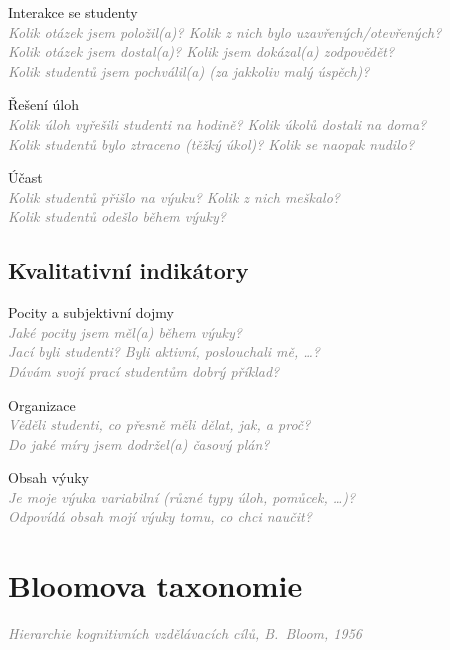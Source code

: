 \documentclass[twoside,openany]{book}
\newcommand{\note}[1]{\textcolor{gray}{\small\itshape #1}}
\begin{document}
Interakce se studenty\\
\note{Kolik otázek jsem položil(a)? Kolik z nich bylo uzavřených/otevřených?\\
Kolik otázek jsem dostal(a)? Kolik jsem dokázal(a) zodpovědět?\\
Kolik studentů jsem pochválil(a) (za jakkoliv malý úspěch)?}

Řešení úloh\\
\note{Kolik úloh vyřešili studenti na hodině? Kolik úkolů dostali na doma?\\
Kolik studentů bylo ztraceno (těžký úkol)? Kolik se naopak nudilo?}

Účast\\
\note{Kolik studentů přišlo na výuku? Kolik z nich meškalo?\\
Kolik studentů odešlo během výuky?}

\section*{Kvalitativní indikátory}

Pocity a subjektivní dojmy\\
\note{Jaké pocity jsem měl(a) během výuky?\\
Jací byli studenti? Byli aktivní, poslouchali mě, \dots?\\
Dávám svojí prací studentům dobrý příklad?}

Organizace\\
\note{Věděli studenti, co přesně měli dělat, jak, a proč?\\
Do jaké míry jsem dodržel(a) časový plán?}

Obsah výuky\\
\note{Je moje výuka variabilní (různé typy úloh, pomůcek, \dots)?\\
Odpovídá obsah mojí výuky tomu, co chci naučit?}

\newpage

\chapter*{Bloomova taxonomie}
\label{bloom}
\vspace{-0.5em}
\note{Hierarchie kognitivních vzdělávacích cílů, B.\ Bloom, 1956}
\vspace{-0.3em}
\end{document}
